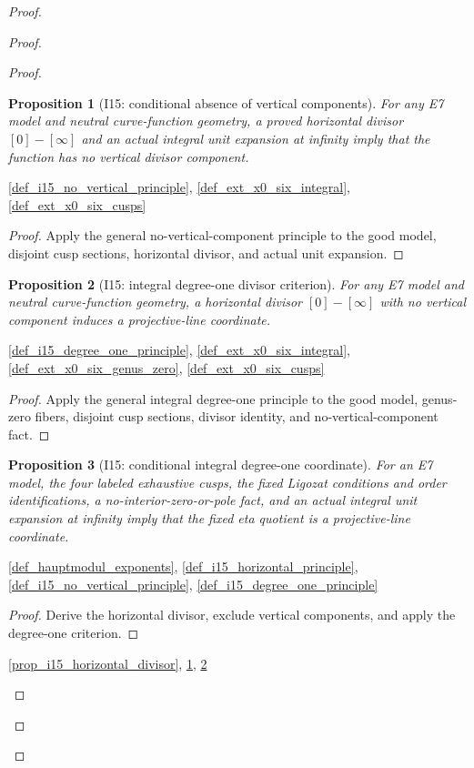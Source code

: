 \documentclass[11pt,a4paper]{article}
\numberwithin{equation}{section}
\theoremstyle{plain}\newtheorem{theorem}{Theorem}[section]\newaliascnt{proposition}{theorem}\newtheorem{proposition}[proposition]{Proposition}\aliascntresetthe{proposition}\newaliascnt{lemma}{theorem}\newtheorem{lemma}[lemma]{Lemma}\aliascntresetthe{lemma}
\theoremstyle{definition}\newaliascnt{definition}{theorem}\newtheorem{definition}[definition]{Definition}\aliascntresetthe{definition}\newaliascnt{notation}{theorem}\newtheorem{notation}[notation]{Notation}\aliascntresetthe{notation}
\providecommand{\lean}[1]{}\providecommand{\leanok}{}
\begin{document}
\begin{proof}
\begin{proof}
\begin{proof}
\begin{proposition}[I15: conditional absence of vertical components]\label{prop_i15_no_vertical_components}\lean{SptCM.CM.Repaired.hauptmodul_no_vertical_component_of_E7}\leanok
For any E7 model and neutral curve-function geometry, a proved horizontal
divisor $[0]-[\infty]$ and an actual integral unit expansion at infinity imply
that the function has no vertical divisor component.
\end{proposition}
\begin{uses-statement}\ref{def_i15_no_vertical_principle}, \ref{def_ext_x0_six_integral}, \ref{def_ext_x0_six_cusps}\end{uses-statement}
\begin{proof}Apply the general no-vertical-component principle to the good model, disjoint cusp sections, horizontal divisor, and actual unit expansion.\end{proof}

\begin{proposition}[I15: integral degree-one divisor criterion]\label{prop_i15_degree_one_criterion}\lean{SptCM.CM.Repaired.integral_degree_one_coordinate_of_E7}\leanok
For any E7 model and neutral curve-function geometry, a horizontal divisor
$[0]-[\infty]$ with no vertical component induces a projective-line coordinate.
\end{proposition}
\begin{uses-statement}\ref{def_i15_degree_one_principle}, \ref{def_ext_x0_six_integral}, \ref{def_ext_x0_six_genus_zero}, \ref{def_ext_x0_six_cusps}\end{uses-statement}
\begin{proof}Apply the general integral degree-one principle to the good model, genus-zero fibers, disjoint cusp sections, divisor identity, and no-vertical-component fact.\end{proof}

\begin{proposition}[I15: conditional integral degree-one coordinate]\label{prop_i15_integral_coordinate}\lean{SptCM.CM.Repaired.hauptmodul_integral_coordinate_of_E7}\leanok
For an E7 model, the four labeled exhaustive cusps, the fixed Ligozat
conditions and order identifications, a no-interior-zero-or-pole fact, and an
actual integral unit expansion at infinity imply that the fixed eta quotient
is a projective-line coordinate.
\end{proposition}
\begin{uses-statement}\ref{def_hauptmodul_exponents}, \ref{def_i15_horizontal_principle}, \ref{def_i15_no_vertical_principle}, \ref{def_i15_degree_one_principle}\end{uses-statement}
\begin{proof}Derive the horizontal divisor, exclude vertical components, and apply the degree-one criterion.\end{proof}
\begin{uses-proof}\ref{prop_i15_horizontal_divisor}, \ref{prop_i15_no_vertical_components}, \ref{prop_i15_degree_one_criterion}\end{uses-proof}


\end{proof}
\end{proof}
\end{proof}
\end{document}

